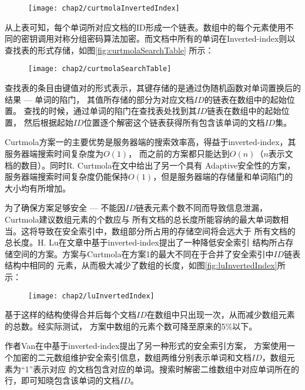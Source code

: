 \begin{figure}[!htp]
  \centering
  \texttt{[image: chap2/curtmolaInvertedIndex]}
\end{figure}

从上表可知，每个单词所对应文档的ID形成一个链表。数组中的每个元素使用不同的密钥调用对称分组密码算法加密。而文档中所有的单词在Inverted-index则以查找表的形式存储，如图\ref{fig:curtmolaSearchTable} 所示：
\begin{figure}[!htp]
  \centering
  \texttt{[image: chap2/curtmolaSearchTable]}
\end{figure}


查找表的条目由键值对的形式表示，其键存储的是通过伪随机函数对单词置换后的结果 --- 单词的陷门，
其值所存储的部分为对应文档$ID$的链表在数组中的起始位置。
查找的时候，通过单词的陷门在查找表处找到其$ID$链表在数组中的起始位置，
然后根据起始$ID$位置逐个解密这个链表获得所有包含该单词的文档$ID$集。

Curtmola方案一的主要优势是服务器端的搜索效率高，得益于inverted-index，其服务器端搜索时间复杂度为$O(1)$，
而之前的方案都只能达到$O(n)$（$n$表示文档的数目）。同时R. Curtmola在文中给出了另一个具有
Adaptive安全性的方案，服务器端搜索时间复杂度仍能保持$O(1)$，但是服务器端的存储量和单词陷门的大小均有所增加。

为了确保方案足够安全 --- 不能因$ID$链表元素个数不同而导致信息泄漏，Curtmola建议数组元素的个数应与
所有文档的总长度所能容纳的最大单词数相当。这将导致在安全索引中，数组部分所占用的存储空间将会远大于
所有文档的总长度。H. Lu在文章\cite{jin2012reducing}中基于inverted-index提出了一种降低安全索引
结构所占存储空间的方案。方案与Curtmola在方案1的最大不同在于合并了安全索引中$ID$链表结构中相同的
元素，从而极大减少了数组的长度，如图\ref{fig:luInvertedIndex}所示：
\begin{figure}[!htp]
  \centering
  \texttt{[image: chap2/luInvertedIndex]}
\end{figure}

基于这样的结构使得合并后每个文档$ID$在数组中只出现一次，从而减少数组元素的总数。经实际测试，
方案中数组的元素个数可降至原来的5\%以下。

作者Van在\cite{van2010computationally}中基于inverted-index提出了另一种形式的安全索引方案，
方案使用一个加密的二元数组维护安全索引信息，数组两维分别表示单词和文档$ID$，数组元素为“1”表示对应
的文档包含对应的单词。搜索时解密二维数组中对应单词所在的行，即可知晓包含该单词的文档$ID$。



